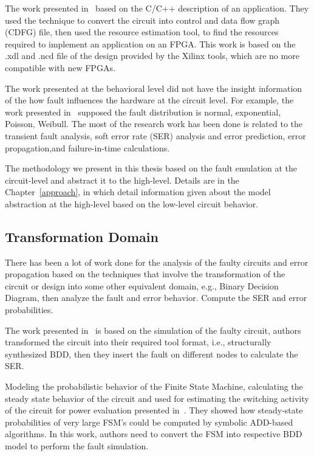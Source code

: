The work presented in~\citep{thibeault2013library} based on the C/C++ description of an application. They used the technique to convert the circuit into control and data flow graph (CDFG) file, then used the resource estimation tool, to find the resources required to implement an application on an FPGA. This work is based on the .xdl and .ncd file of the design provided by the Xilinx tools, which are no more compatible with new FPGAs.


The work presented at the behavioral level did not have the insight information of the how fault influences the hardware at the circuit level. For example, the work presented in~\citep{janschek2017errorsim} supposed the fault distribution is normal, exponential, Poisson, Weibull. The most of the research work has been done is related to the transient fault analysis, soft error rate (SER) analysis and error prediction, error propagation,and failure-in-time calculations.


The methodology we present in this thesis based on the fault emulation at the circuit-level and abstract it to the high-level. Details are in the Chapter~\ref{approach}, in which detail information given about the model abstraction at the high-level based on the low-level circuit behavior.


\subsection{Transformation Domain}



There has been a lot of work done for the analysis of the faulty circuits and error propagation based on the techniques that involve the transformation of the circuit or design into some other equivalent domain, e.g., Binary Decision Diagram, then analyze the fault and error behavior. Compute the SER  and error probabilities.

The work presented in~\citep{ubar2014modeling} is based on the simulation of the faulty circuit, authors transformed the circuit into their required tool format, i.e., structurally synthesized BDD, then they
insert the fault on different nodes to calculate the SER. 


Modeling the probabilistic behavior of the Finite State Machine, calculating the steady state
behavior of the circuit and used for estimating the switching activity of the circuit for
power evaluation presented in~\citep{hachtel1996markovian}. They showed how steady-state probabilities of very large FSM’s could be computed by
symbolic ADD-based algorithms. In this work, authors need to convert the FSM into respective BDD model to perform the fault simulation.


